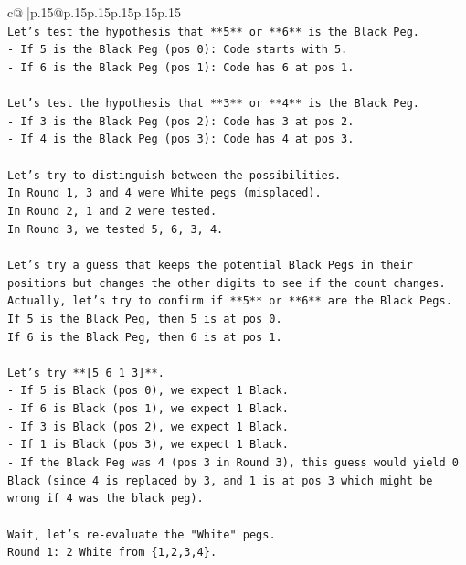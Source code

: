 \documentclass{article}
\begin{document}
{\begin{supertabular}{c@{$\;$}|p{.15\linewidth}@{}p{.15\linewidth}p{.15\linewidth}p{.15\linewidth}p{.15\linewidth}p{.15\linewidth}}
{{{\\ 
\texttt{Let's test the hypothesis that **5** or **6** is the Black Peg.} \\
\texttt{{-} If 5 is the Black Peg (pos 0): Code starts with 5.} \\
\texttt{{-} If 6 is the Black Peg (pos 1): Code has 6 at pos 1.} \\
\\ 
\texttt{Let's test the hypothesis that **3** or **4** is the Black Peg.} \\
\texttt{{-} If 3 is the Black Peg (pos 2): Code has 3 at pos 2.} \\
\texttt{{-} If 4 is the Black Peg (pos 3): Code has 4 at pos 3.} \\
\\ 
\texttt{Let's try to distinguish between the possibilities.} \\
\texttt{In Round 1, 3 and 4 were White pegs (misplaced).} \\
\texttt{In Round 2, 1 and 2 were tested.} \\
\texttt{In Round 3, we tested 5, 6, 3, 4.} \\
\\ 
\texttt{Let's try a guess that keeps the potential Black Pegs in their positions but changes the other digits to see if the count changes.} \\
\texttt{Actually, let's try to confirm if **5** or **6** are the Black Pegs.} \\
\texttt{If 5 is the Black Peg, then 5 is at pos 0.} \\
\texttt{If 6 is the Black Peg, then 6 is at pos 1.} \\
\\ 
\texttt{Let's try **{[}5 6 1 3{]}**.} \\
\texttt{{-} If 5 is Black (pos 0), we expect 1 Black.} \\
\texttt{{-} If 6 is Black (pos 1), we expect 1 Black.} \\
\texttt{{-} If 3 is Black (pos 2), we expect 1 Black.} \\
\texttt{{-} If 1 is Black (pos 3), we expect 1 Black.} \\
\texttt{{-} If the Black Peg was 4 (pos 3 in Round 3), this guess would yield 0 Black (since 4 is replaced by 3, and 1 is at pos 3 which might be wrong if 4 was the black peg).} \\
\\ 
\texttt{Wait, let's re{-}evaluate the "White" pegs.} \\
\texttt{Round 1: 2 White from \{1,2,3,4\}.} \\
}}}
\end{supertabular}}
\end{document}
